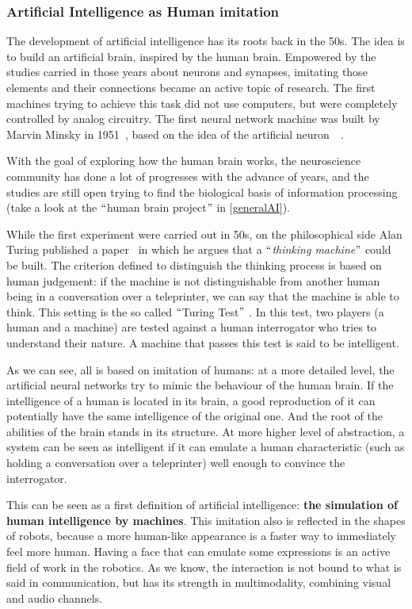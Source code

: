 \subsubsection{Artificial Intelligence as Human imitation}
The development of artificial intelligence has its roots back in the 50s. The idea is to build an artificial brain, inspired by the human brain. Empowered by the studies carried in those years about neurons and synapses, imitating those elements and their connections became an active topic of research. The first machines trying to achieve this task did not use computers, but were completely controlled by analog circuitry. The first neural network machine was built by Marvin Minsky in 1951~\cite{minsky1952neural}, based on the idea of the artificial neuron~\cite{mcculloch1943logical}~\cite{rosenblatt1958perceptron}.

With the goal of exploring how the human brain works, the neuroscience community has done a lot of progresses with the advance of years, and the studies are still open trying to find the biological basis of information processing (take a look at the $``$human brain project$"$  in \ref{generalAI}).

While the first experiment were carried out in 50s, on the philosophical side Alan Turing published a paper~\cite{turing1950computing} in which he argues that a $``$\textit{thinking machine}$"$  could be built. The criterion defined to distinguish the thinking process is based on human judgement: if the machine is not distinguishable from another human being in a conversation over a teleprinter, we can say that the machine is able to think. This setting is the so called $``$Turing Test$"$ . In this test, two players (a human and a machine) are tested against a human interrogator who tries to understand their nature. A machine that passes this test is said to be intelligent.

As we can see, all is based on imitation of humans: at a more detailed level, the artificial neural networks try to mimic the behaviour of the human brain. If the intelligence of a human is located in its brain, a good reproduction of it can potentially have the same intelligence of the original one. And the root of the abilities of the brain stands in its structure. At more higher level of abstraction, a system can be seen as intelligent if it can emulate a human characteristic (such as holding a conversation over a teleprinter) well enough to convince the interrogator.

This can be seen as a first definition of artificial intelligence: \textbf{the simulation of human intelligence by machines}. This imitation also is reflected in the shapes of robots, because a more human-like appearance is a faster way to immediately feel more human. Having a face that can emulate some expressions is an active field of work in the robotics. As we know, the interaction is not bound to what is said in communication, but has its strength in multimodality, combining visual and audio channels.

